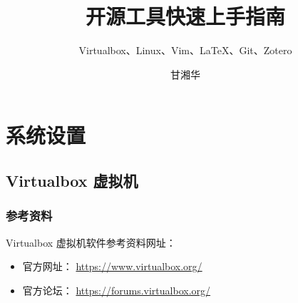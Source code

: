 \documentclass[
    11pt,
    cite=authoryear,
    device=normal,
    lang=cn,
    mode=simple,
    result=answer,
    toc=onecol,
]{elegantbook_sierxue}
\title{开源工具快速上手指南}
\subtitle{Virtualbox、Linux、Vim、\LaTeX{}、Git、Zotero}
\author{甘湘华}
\institute{西南财经大学} %
\date{\zhtoday}
\begin{document}
\maketitle

\setcounter{tocdepth}{2}
\tableofcontents

\mainmatter
\hypersetup{pageanchor=true}

\chapter{系统设置}
\label{cha:settings-system}

\section{Virtualbox 虚拟机}%
\label{sec:vbox}

\subsection{参考资料}%
\label{sub:vbox-refs}

Virtualbox 虚拟机软件参考资料网址：
\begin{itemize}
    \item 官方网址： \href{https://www.virtualbox.org/}{https://www.virtualbox.org/}
    \item 官方论坛： \href{https://forums.virtualbox.org/}{https://forums.virtualbox.org/}
\end{itemize}
\end{document}

